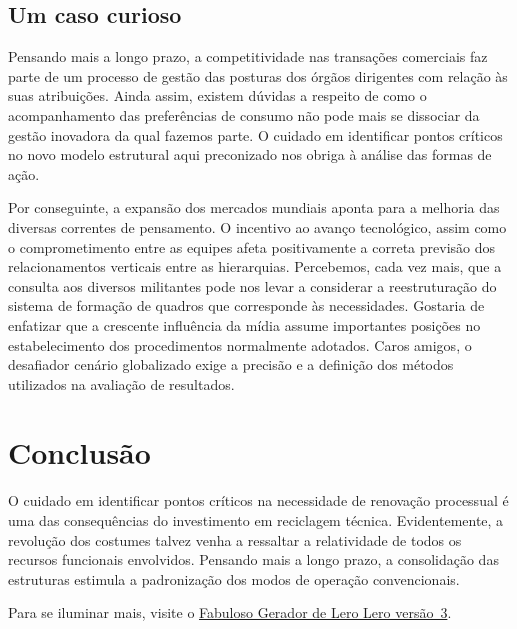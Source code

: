 \documentclass[oneside,twocolumn,a4paper]{article}
\begin{document}
\subsection{Um caso curioso}

Pensando mais a longo prazo, a competitividade nas transações comerciais faz
parte de um processo de gestão das posturas dos órgãos dirigentes com relação
às suas atribuições. Ainda assim, existem dúvidas a respeito de como o
acompanhamento das preferências de consumo não pode mais se dissociar da gestão
inovadora da qual fazemos parte. O cuidado em identificar pontos críticos no
novo modelo estrutural aqui preconizado nos obriga à análise das formas de
ação.

Por conseguinte, a expansão dos mercados mundiais aponta para a melhoria das
diversas correntes de pensamento. O incentivo ao avanço tecnológico, assim como
o comprometimento entre as equipes afeta positivamente a correta previsão dos
relacionamentos verticais entre as hierarquias. Percebemos, cada vez mais, que
a consulta aos diversos militantes pode nos levar a considerar a reestruturação
do sistema de formação de quadros que corresponde às necessidades. Gostaria de
enfatizar que a crescente influência da mídia assume importantes posições no
estabelecimento dos procedimentos normalmente adotados. Caros amigos, o
desafiador cenário globalizado exige a precisão e a definição dos métodos
utilizados na avaliação de resultados.

\section{Conclusão}

O cuidado em identificar pontos críticos na necessidade de renovação processual
é uma das consequências do investimento em reciclagem técnica. Evidentemente, a
revolução dos costumes talvez venha a ressaltar a relatividade de todos os
recursos funcionais envolvidos. Pensando mais a longo prazo, a consolidação das
estruturas estimula a padronização dos modos de operação convencionais. 

Para se iluminar mais, visite o
\href{http://lerolero.miguelborges.com/}{Fabuloso Gerador de Lero Lero
versão~3}.
\end{document}
